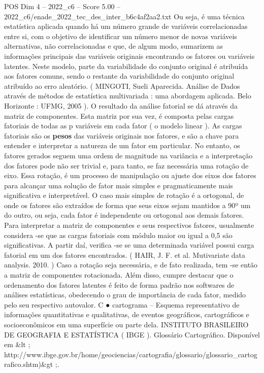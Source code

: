\begin{textsample}{POS Dim 4 – 2022\_c6 – Score 5.00 – 2022\_c6/enade\_2022\_tec\_des\_inter\_b6c4af2aa2.txt}
Ou seja, é uma técnica estatística aplicada quando há um número grande de variáveis correlacionadas entre si, com o objetivo de identificar um número menor de novas variáveis alternativas, não correlacionadas e que, de algum modo, sumarizem as informações principais das variáveis originais encontrando os fatores ou variáveis latentes.
Neste modelo, parte da variabilidade do conjunto original é atribuída aos fatores comuns, sendo o restante da variabilidade do conjunto original atribuído ao erro aleatório. ( MINGOTI, Sueli Aparecida.
Análise de Dados através de métodos de estatística multivariada : uma abordagem aplicada.
Belo Horizonte : UFMG, 2005 ).
O resultado da análise fatorial se dá através da matriz de componentes.
Esta matriz por sua vez, é composta pelas cargas fatoriais de todas as p variáveis em cada fator ( o modelo linear ).
As cargas fatoriais são os \textbf{pesos} das variáveis originais nos fatores, e são a chave para entender e interpretar a natureza de um fator em particular.
No entanto, os fatores gerados seguem uma ordem de magnitude na variância e a interpretação dos fatores pode não ser trivial e, para tanto, se faz necessária uma rotação de eixo.
Essa rotação, é um processo de manipulação ou ajuste dos eixos dos fatores para alcançar uma solução de fator mais simples e pragmaticamente mais significativa e interpretável.
O caso mais simples de rotação é a ortogonal, de onde os fatores são extraídos de forma que seus eixos sejam mantidos a 90º um do outro, ou seja, cada fator é independente ou ortogonal aos demais fatores.
Para interpretar a matriz de componentes e seus respectivos fatores, usualmente considera -se que as cargas fatoriais com módulo maior ou igual a 0,5 são significativas.
A partir daí, verifica -se se uma determinada variável possui carga fatorial em um dos fatores encontrados. ( HAIR, J.
F. et al.
Mutivariate data analysis. 2010. ) Caso a rotação seja necessária, e de fato realizada, tem -se então a matriz de componentes rotacionada.
Além disso, cumpre destacar que o ordenamento dos fatores latentes é feito de forma padrão nos softwares de análises estatísticas, obedecendo o grau de importância de cada fator, medido pelo seu respectivo autovalor.
C {\EmojiFont ●} cartograma – Esquema representativo de informações quantitativas e qualitativas, de eventos geográficos, cartográficos e socioeconômicos em uma superfície ou parte dela.
INSTITUTO BRASILEIRO DE GEOGRAFIA E ESTATÍSTICA ( IBGE ).
Glossário Cartográfico.
Disponível em \&lt ; http://www.ibge.gov.br/home/geociencias/cartografia/glossario/glossario\_cartografico.shtm)\&gt ;.

\end{textsample}
